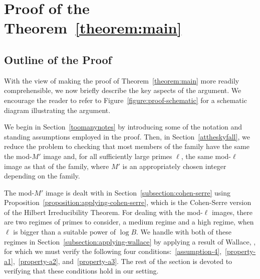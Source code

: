 \section{Proof of the Theorem~\ref{theorem:main}} \label{section:new-proof-of-main-theorem}

\def\arraystretch{0.7}
\subsection{Outline of the Proof}
\label{subsection:outline}

With the view of making the proof of Theorem~\ref{theorem:main} more readily comprehensible, we now briefly describe the key aspects of the argument. We encourage the reader to refer to Figure~\ref{figure:proof-schematic} for a schematic diagram illustrating the argument.

We begin in Section~\ref{toomanynotes} by introducing some of the notation and standing assumptions employed in the proof. Then, in Section~\ref{attheskyfall}, we reduce the problem to
checking that most members of the family have the same
the mod-$M'$ image and, for all sufficiently large primes $\ell$, the same mod-$\ell$ image as that of the family,
where $M'$ is an appropriately chosen integer depending on the family.

The mod-$M'$ image is dealt with in Section~\ref{subsection:cohen-serre}
using Proposition~\ref{proposition:applying-cohen-serre}, which is the Cohen-Serre version of the Hilbert Irreducibility Theorem.
For dealing with the mod-$\ell$ images,
there are two regimes of primes to consider, a medium
regime and a high regime, when $\ell$ is bigger than a suitable power of $\log B$.
We handle with both of these regimes in Section~\ref{subsection:applying-wallace} by applying a result of Wallace, \cite[Theorem 3.9]{scoopdedoo}, for which we must verify the following four conditions:~\ref{assumption-4},~\ref{property-a1},~\ref{property-a2}, and~\ref{property-a3}. The rest of the section is devoted to verifying that these conditions hold in our setting.

